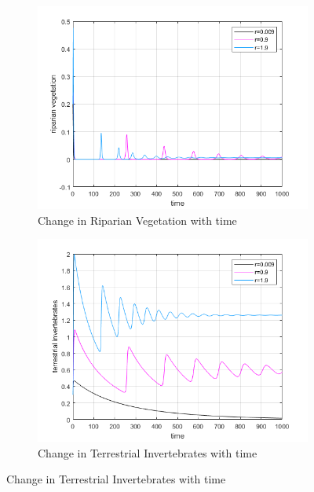 \documentclass[12pt]{article}
\numberwithin{equation}{section}
\begin{document}
\begin{figure}[bp!]
	\centering
        \caption{Variation in parameter r}
	\begin{subfigure}[t]{0.45\textwidth}
		\centering
	\includegraphics[width=\textwidth]{time_vs_riparian_r.png}
		\caption{Change in Riparian Vegetation with time} \label{fig:time_vs_riparian_r}
	\end{subfigure}
\hspace{0.08\textwidth}
        \begin{subfigure}[t]{0.45\textwidth}
                 \centering
         \includegraphics[width=\textwidth]{time_vs_invertebrates_r.png}
		\caption{Change in Terrestrial Invertebrates with time} \label{fig:time_vs_invertebrates_r}

\end{subfigure}
\end{figure}
\end{document}

